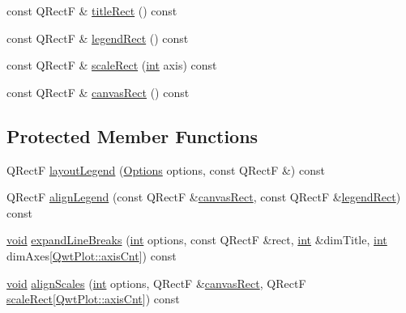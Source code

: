 \begin{DoxyCompactItemize}
\item 
const Q\-Rect\-F \& \hyperlink{class_qwt_plot_layout_adfa052a36e48ae0ae625f9f875b739a6}{title\-Rect} () const 
\item 
const Q\-Rect\-F \& \hyperlink{class_qwt_plot_layout_ac8df9a500b5f9903d5658d99f83c5d5c}{legend\-Rect} () const 
\item 
const Q\-Rect\-F \& \hyperlink{class_qwt_plot_layout_a9d84ec8ba0482f629798d076d0a7d902}{scale\-Rect} (\hyperlink{ioapi_8h_a787fa3cf048117ba7123753c1e74fcd6}{int} axis) const 
\item 
const Q\-Rect\-F \& \hyperlink{class_qwt_plot_layout_ac18259224add32db416a591a03738d75}{canvas\-Rect} () const 
\end{DoxyCompactItemize}
\subsection*{Protected Member Functions}
\begin{DoxyCompactItemize}
\item 
Q\-Rect\-F \hyperlink{class_qwt_plot_layout_ae5eebbda9691833dfb5d2aa6a193f131}{layout\-Legend} (\hyperlink{class_qwt_plot_layout_aa43457184903f3aaa58e6e073622ef52}{Options} options, const Q\-Rect\-F \&) const 
\item 
Q\-Rect\-F \hyperlink{class_qwt_plot_layout_a38c8c706367c67e36664bf901fd14f36}{align\-Legend} (const Q\-Rect\-F \&\hyperlink{class_qwt_plot_layout_ac18259224add32db416a591a03738d75}{canvas\-Rect}, const Q\-Rect\-F \&\hyperlink{class_qwt_plot_layout_ac8df9a500b5f9903d5658d99f83c5d5c}{legend\-Rect}) const 
\item 
\hyperlink{group___u_a_v_objects_plugin_ga444cf2ff3f0ecbe028adce838d373f5c}{void} \hyperlink{class_qwt_plot_layout_ac50f01f0fc49f0dc4028f56f56149d88}{expand\-Line\-Breaks} (\hyperlink{ioapi_8h_a787fa3cf048117ba7123753c1e74fcd6}{int} options, const Q\-Rect\-F \&rect, \hyperlink{ioapi_8h_a787fa3cf048117ba7123753c1e74fcd6}{int} \&dim\-Title, \hyperlink{ioapi_8h_a787fa3cf048117ba7123753c1e74fcd6}{int} dim\-Axes\mbox{[}\hyperlink{class_qwt_plot_a81df699dcf9dde0752c0726b5f31e271aea62036dfd48ee0f9450718592614892}{Qwt\-Plot\-::axis\-Cnt}\mbox{]}) const 
\item 
\hyperlink{group___u_a_v_objects_plugin_ga444cf2ff3f0ecbe028adce838d373f5c}{void} \hyperlink{class_qwt_plot_layout_aba8d76ed436cb36052decee7732bf6e0}{align\-Scales} (\hyperlink{ioapi_8h_a787fa3cf048117ba7123753c1e74fcd6}{int} options, Q\-Rect\-F \&\hyperlink{class_qwt_plot_layout_ac18259224add32db416a591a03738d75}{canvas\-Rect}, Q\-Rect\-F \hyperlink{class_qwt_plot_layout_a9d84ec8ba0482f629798d076d0a7d902}{scale\-Rect}\mbox{[}\hyperlink{class_qwt_plot_a81df699dcf9dde0752c0726b5f31e271aea62036dfd48ee0f9450718592614892}{Qwt\-Plot\-::axis\-Cnt}\mbox{]}) const 
\end{DoxyCompactItemize}


